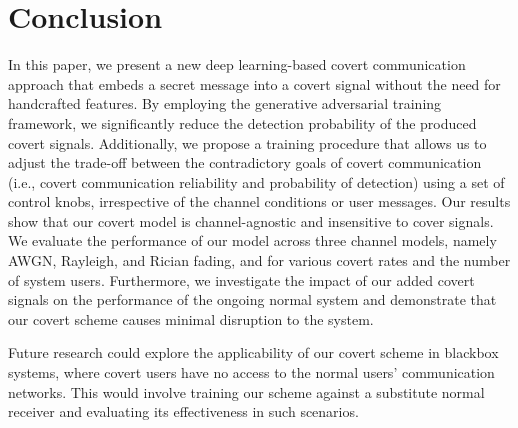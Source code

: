 \section{Conclusion}
\label{s:conc}
In this paper, we present a new deep learning-based covert communication approach that embeds a secret message into a covert signal without the need for handcrafted features. By employing the generative adversarial training framework, we significantly reduce the detection probability of the produced covert signals. Additionally, we propose a training procedure that allows us to adjust the trade-off between the contradictory goals of covert communication (i.e., covert communication reliability and probability of detection) using a set of control knobs, irrespective of the channel conditions or user messages. Our results show that our covert model is channel-agnostic and insensitive to cover signals. We evaluate the performance of our model across three channel models, namely AWGN, Rayleigh, and Rician fading, and for various covert rates and the number of system users. Furthermore, we investigate the impact of our added covert signals on the performance of the ongoing normal system and demonstrate that our covert scheme causes minimal disruption to the system.

Future research could explore the applicability of our covert scheme in blackbox systems, where covert users have no access to the normal users' communication networks. This would involve training our scheme against a substitute normal receiver and evaluating its effectiveness in such scenarios.